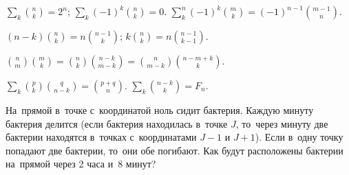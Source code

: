 \begin{problems}

\item
\(\displaystyle
    \sum_{k}
        \binom{n}{k}
=
    2^n
\);
\quad
\(\displaystyle
    \sum_{k}
        (-1)^k \binom{n}{k}
=
    0
\).
\qquad
\problem
\(\displaystyle
    \sum_{k}^n
        (-1)^k \binom{m}{k}
=
    (-1)^{n-1} \binom{m-1}{n}
\).

\item
\(\displaystyle
    (n - k) \binom{n}{k}
=
    n \binom{n - 1}{k}
\);
\quad
\(\displaystyle
    k \binom{n}{k}
=
    n \binom{n - 1}{k - 1}
\).

\(\displaystyle
    \binom{n}{m} \binom{m}{k}
=
    \binom{n}{k} \binom{n - k}{m - k}
=
    \binom{n}{m - k} \binom{n - m + k}{k}
\).

\(\displaystyle
    \sum_{k}
        \binom{p}{k} \binom{q}{n - k}
=
    \binom{p + q}{n}
\).
\qquad{}%
\problem
\(\displaystyle
    \sum_{k}
        \binom{n - k}{k}
=
    F_n
\).

\item
На~прямой в~точке с~координатой ноль сидит бактерия.
Каждую минуту бактерия делится
(если бактерия находилась в~точке $J$, то~через минуту две бактерии находятся
в~точках с~координатами $J - 1$ и $J + 1$).
Если в~одну точку попадают две бактерии, то~они обе погибают.
Как будут расположены бактерии на~прямой через 2 часа и~8 минут?

\end{problems}

